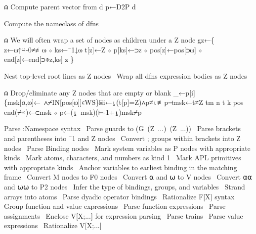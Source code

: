 \documentclass{article}%
\begin{document}
⍝ Compute parent vector from d
p←D2P d

\LA{}Compute the nameclass of dfns~{\nwtagstyle{}}\RA{}

⍝ We will often wrap a set of nodes as children under a Z node
gz←\{
        z←⍵↑⍨-0≠≢⍵ ⋄ ks←¯1↓⍵
        t[z]←Z ⋄ p[ks]←⊃z ⋄ pos[z]←pos[⊃⍵] ⋄ end[z]←end[⊃⌽z,ks]
        z
\}

\LA{}Nest top-level root lines as \code{}Z\edoc{} nodes~{\nwtagstyle{}}\RA{}
\LA{}Wrap all dfns expression bodies as \code{}Z\edoc{} nodes~{\nwtagstyle{}}\RA{}

⍝ Drop/eliminate any Z nodes that are empty or blank
_←p[i]\{msk[⍺,⍵]←~∧⌿IN[pos[⍵]]∊WS\}⌸i←⍸(t[p]=Z)∧p≠⍳≢p⊣msk←t≠Z
tm n t k pos end(⌿⍨)←⊂msk ⋄ p←(⍸~msk)(⊢-1+⍸)msk⌿p

\LA{}Parse \code{}:Namespace\edoc{} syntax~{\nwtagstyle{}}\RA{}
\LA{}Parse guards to \code{}(G\ (Z\ ...)\ (Z\ ...))\edoc{}~{\nwtagstyle{}}\RA{}
\LA{}Parse brackets and parentheses into \code{}¯1\edoc{} and \code{}Z\edoc{} nodes~{\nwtagstyle{}}\RA{}
\LA{}Convert \code{};\edoc{} groups within brackets into \code{}Z\edoc{} nodes~{\nwtagstyle{}}\RA{}
\LA{}Parse Binding nodes~{\nwtagstyle{}}\RA{}
\LA{}Mark system variables as \code{}P\edoc{} nodes with appropriate kinds~{\nwtagstyle{}}\RA{}
\LA{}Mark atoms, characters, and numbers as kind \code{}1\edoc{}~{\nwtagstyle{}}\RA{}
\LA{}Mark APL primitives with appropriate kinds~{\nwtagstyle{}}\RA{}
\LA{}Anchor variables to earliest binding in the matching frame~{\nwtagstyle{}}\RA{}
\LA{}Convert \code{}M\edoc{} nodes to \code{}F0\edoc{} nodes~{\nwtagstyle{}}\RA{}
\LA{}Convert \code{}⍺\edoc{} and \code{}⍵\edoc{} to \code{}V\edoc{} nodes~{\nwtagstyle{}}\RA{}
\LA{}Convert \code{}⍺⍺\edoc{} and \code{}⍵⍵\edoc{} to \code{}P2\edoc{} nodes~{\nwtagstyle{}}\RA{}
\LA{}Infer the type of bindings, groups, and variables~{\nwtagstyle{}}\RA{}
\LA{}Strand arrays into atoms~{\nwtagstyle{}}\RA{}
\LA{}Parse dyadic operator bindings~{\nwtagstyle{}}\RA{}
\LA{}Rationalize \code{}F[X]\edoc{} syntax~{\nwtagstyle{}}\RA{}
\LA{}Group function and value expressions~{\nwtagstyle{}}\RA{}
\LA{}Parse function expressions~{\nwtagstyle{}}\RA{}
\LA{}Parse assignments~{\nwtagstyle{}}\RA{}
\LA{}Enclose \code{}V[X;...]\edoc{} for expression parsing~{\nwtagstyle{}}\RA{}
\LA{}Parse trains~{\nwtagstyle{}}\RA{}
\LA{}Parse value expressions~{\nwtagstyle{}}\RA{}
\LA{}Rationalize \code{}V[X;...]\edoc{}~{\nwtagstyle{}}\RA{}
\end{document}
